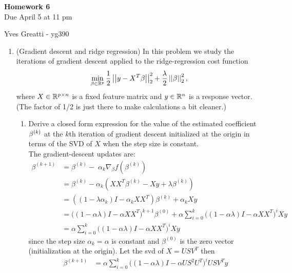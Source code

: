 \documentclass[12pt,twoside]{article}
\begin{document}
\begin{center}
{\large{\textbf{Homework 6}} } \vspace{0.2cm}\\
Due April 5 at 11 pm
\end{center}
Yves Greatti - yg390\\

\begin{enumerate}

\item (Gradient descent and ridge regression) In this problem we study the iterations of gradient descent applied to the ridge-regression cost function
\begin{align}
\min_{\beta \in \mathbb{R}^p} \frac{1}{2}\left|\left| y-X^T\beta \right|\right| _{2}^2 + \frac{\lambda}{2}\left|\left| \beta \right|\right| _{2}^2,
\end{align}
where $X \in \mathbb{R}^{p \times n}$ is a fixed feature matrix and $y\in \mathbb{R}^{n}$ is a response vector. (The factor of 1/2 is just there to make calculations a bit cleaner.)
\begin{enumerate}
\item Derive a closed form expression for the value of the estimated coefficient $\beta^{\left( k \right)}$ at the $k$th iteration of gradient descent initialized at the origin in terms of the SVD of $X$ when the step size is constant. \\

The gradient-descent updates are:
\begin{align*}
		\beta^{(k+1)}	&=	\beta^{(k)} - \; \alpha_k \nabla_{\beta} f(\beta^{(k)})	\\
					&=	\beta^{(k)}  - \alpha_k (X X^T \beta^{(k)} - X y +  \lambda \beta^{(k)}) \\
					&=    ((1- \lambda \alpha_k) I  - \alpha_k X X^T) \beta^{(k)}  +  \alpha_k  X y  \\
					&=	\big( ( 1 - \alpha \lambda) I - \alpha X X^T  \big)^{k+1} \beta^{(0)}  +	\alpha \sum_{i=0}^k \big( (1 - \alpha \lambda) I - \alpha X X^T \big)^i X y \\
					&=	\alpha \sum_{i=0}^k \big( (1 - \alpha \lambda) I - \alpha X X^T \big)^i X y \
\end{align*}
since the step size $\alpha_k = \alpha$ is constant and $\beta^{(0)}$ is the zero vector (initialization at the origin).    
Let the svd of $X = U S V^T$ then 
\begin{align*}
		\beta^{(k+1)}	&= \alpha  \sum_{i=0}^k \big( (1 - \alpha \lambda) I - \alpha U S^2 U^T  \big)^i U S V^T y \\
\end{align*}


\end{enumerate}
\end{enumerate}
\end{document}
